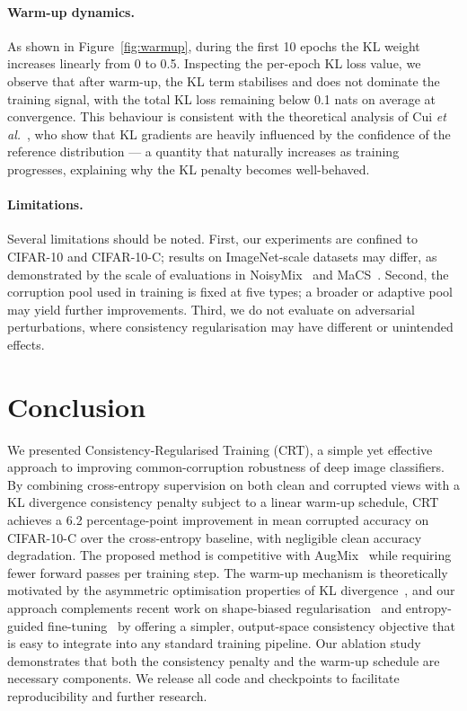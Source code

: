 \documentclass[10pt,twocolumn]{article}
\begin{document}
\paragraph{Warm-up dynamics.} As shown in Figure~\ref{fig:warmup}, during the first 10 epochs the KL weight increases linearly from 0 to 0.5. Inspecting the per-epoch KL loss value, we observe that after warm-up, the KL term stabilises and does not dominate the training signal, with the total KL loss remaining below 0.1 nats on average at convergence. This behaviour is consistent with the theoretical analysis of Cui \emph{et al.}~\cite{cui2025gkl}, who show that KL gradients are heavily influenced by the confidence of the reference distribution --- a quantity that naturally increases as training progresses, explaining why the KL penalty becomes well-behaved. 

\paragraph{Limitations.} Several limitations should be noted. First, our experiments are confined to CIFAR-10 and CIFAR-10-C; results on ImageNet-scale datasets may differ, as demonstrated by the scale of evaluations in NoisyMix~\cite{erichson2024noisymix} and MaCS~\cite{khazem2026macs}. Second, the corruption pool used in training is fixed at five types; a broader or adaptive pool may yield further improvements. Third, we do not evaluate on adversarial perturbations, where consistency regularisation may have different or unintended effects.

\section{Conclusion}

We presented Consistency-Regularised Training (CRT), a simple yet effective approach to improving common-corruption robustness of deep image classifiers. By combining cross-entropy supervision on both clean and corrupted views with a KL divergence consistency penalty subject to a linear warm-up schedule, CRT achieves a 6.2 percentage-point improvement in mean corrupted accuracy on CIFAR-10-C over the cross-entropy baseline, with negligible clean accuracy degradation. The proposed method is competitive with AugMix~\cite{hendrycks2020augmix} while requiring fewer forward passes per training step. The warm-up mechanism is theoretically motivated by the asymmetric optimisation properties of KL divergence~\cite{cui2025gkl}, and our approach complements recent work on shape-biased regularisation~\cite{ranabhat2025shapebias} and entropy-guided fine-tuning~\cite{kumar2026demhec} by offering a simpler, output-space consistency objective that is easy to integrate into any standard training pipeline. Our ablation study demonstrates that both the consistency penalty and the warm-up schedule are necessary components. We release all code and checkpoints to facilitate reproducibility and further research.
\end{document}
